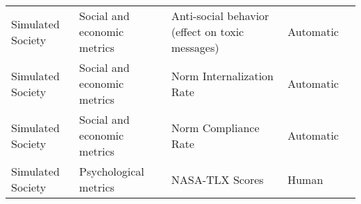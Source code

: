 \begin{small}
\begin{center}
\begin{longtable}{@{}p{}p{}p{}p{}p{}@{}}
Simulated Society        & Social and economic metrics         & Anti-social behavior (effect on toxic messages)                                                                                                                                                             & Automatic & \cite{campedelli2024iwantbreakfree}                                                                                                                                                                                                                                                                                                                                                                                                \\
Simulated Society        & Social and economic metrics         & Norm Internalization Rate                                                                                                                                                                                   & Automatic & \cite{ren2024emergencesocialnormsgenerative}                                                                                                                                                                                                                                                                                                                                                                                                     \\
Simulated Society        & Social and economic metrics         & Norm Compliance Rate                                                                                                                                                                                        & Automatic & \cite{ren2024emergencesocialnormsgenerative}                                                                                                                                                                                                                                                                                                                                                                                                     \\
Simulated Society        & Psychological metrics & NASA-TLX Scores                                                                                                                                                                                             & Human     & \cite{10.1145/3613904.3642545}                                                                                                                                                                                                                                                                                                                                                                          \\

\end{longtable}
\end{center}
\end{small}
